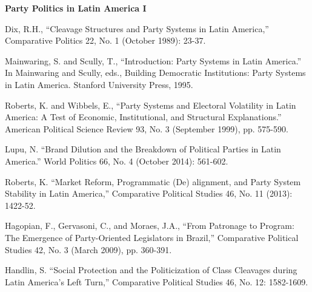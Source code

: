 \documentclass[letterpaper]{article}
\renewenvironment{itemize}{
  \begin{list}{}{
    \setlength{\leftmargin}{1.5em}
  }
}{
  \end{list}
}
\begin{document}
\begin{enumerate}
\item {\bf Party Politics in Latin America I}
	\begin{itemize}
		\item[$\bullet$] Dix, R.H., ``Cleavage Structures and Party Systems in Latin America,'' Comparative Politics 22, No. 1 (October 1989): 23-37.
		\item[$\bullet$] Mainwaring, S. and Scully, T., ``Introduction: Party Systems in Latin America.'' In Mainwaring and Scully, eds., Building Democratic Institutions: Party Systems in Latin America. Stanford University Press, 1995.
		\item[$\bullet$] Roberts, K. and Wibbels, E., ``Party Systems and Electoral Volatility in Latin America: A Test of Economic, Institutional, and Structural Explanations.'' American Political Science Review 93, No. 3 (September 1999), pp. 575-590.
		\item[$\bullet$] Lupu, N. ``Brand Dilution and the Breakdown of Political Parties in Latin America.'' World Politics 66, No. 4 (October 2014): 561-602.
		\item[$\bullet$] Roberts, K. ``Market Reform, Programmatic (De) alignment, and Party System Stability in Latin America,'' Comparative Political Studies 46, No. 11 (2013): 1422-52.
		\item[$\bullet$] Hagopian, F., Gervasoni, C., and Moraes, J.A., ``From Patronage to Program: The Emergence of Party-Oriented Legislators in Brazil,'' Comparative Political Studies 42, No. 3 (March 2009), pp. 360-391.
		\item[$\bullet$] Handlin, S. ``Social Protection and the Politicization of Class Cleavages during Latin America's Left Turn,'' Comparative Political Studies 46, No. 12: 1582-1609.
	\end{itemize}




\end{enumerate}
\end{document}
